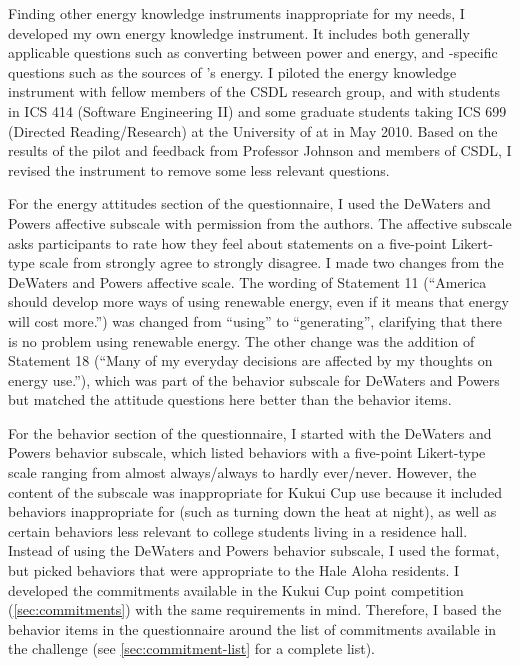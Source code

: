 Finding other energy knowledge instruments inappropriate for my needs, I developed my own energy knowledge instrument. It includes both generally applicable questions such as converting between power and energy, and \Hawaii-specific questions such as the sources of \Hawaii's energy. I piloted the energy knowledge instrument with fellow members of the CSDL research group, and with students in ICS 414 (Software Engineering II) and some graduate students taking ICS 699 (Directed Reading/Research) at the University of \Hawaii at \Manoa in May 2010. Based on the results of the pilot and feedback from Professor Johnson and members of CSDL, I revised the instrument to remove some less relevant questions.

For the energy attitudes section of the questionnaire, I used the DeWaters and Powers affective subscale with permission from the authors. The affective subscale asks participants to rate how they feel about statements on a five-point Likert-type scale from strongly agree to strongly disagree. I made two changes from the DeWaters and Powers affective scale. The wording of Statement 11 (``America should develop more ways of using renewable energy, even if it means that energy will cost more.'') was changed from ``using'' to ``generating'', clarifying that there is no problem using renewable energy. The other change was the addition of Statement 18 (``Many of my everyday decisions are affected by my thoughts on energy use.''), which was part of the behavior subscale for DeWaters and Powers but matched the attitude questions here better than the behavior items.
 
For the behavior section of the questionnaire, I started with the DeWaters and Powers behavior subscale, which listed behaviors with a five-point Likert-type scale ranging from almost always/always to hardly ever/never. However, the content of the subscale was inappropriate for Kukui Cup use because it included behaviors inappropriate for \Hawaii (such as turning down the heat at night), as well as certain behaviors less relevant to college students living in a residence hall. Instead of using the DeWaters and Powers behavior subscale, I used the format, but picked behaviors that were appropriate to the Hale Aloha residents. I developed the commitments available in the Kukui Cup point competition (\autoref{sec:commitments}) with the same requirements in mind. Therefore, I based the behavior items in the questionnaire around the list of commitments available in the challenge (see \autoref{sec:commitment-list} for a complete list).

